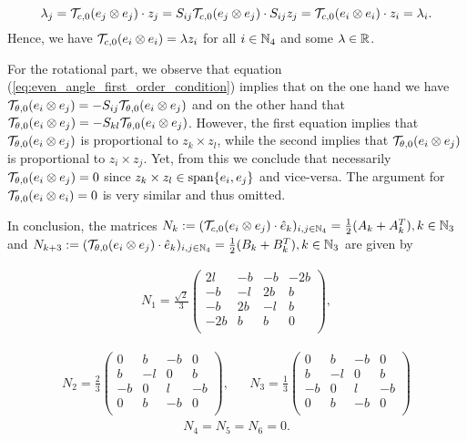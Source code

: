 \begin{equation}
\lambda_j = \mathcal{T}_{c,0}(e_j \otimes e_j) \cdot z_j = S_{ij} \mathcal{T}_{c,0}(e_j \otimes e_j) \cdot S_{ij} z_j = \mathcal{T}_{c,0}(e_i \otimes e_i) \cdot z_i = \lambda_i.
\end{equation}
Hence, we have $\mathcal{T}_{c,0}(e_i\otimes e_i) = \lambda z_i$ for all $i\in \mathbb{N}_4$ and some $\lambda \in \mathbb{R}$.

For the rotational part, we observe that equation (\ref{eq:even_angle_first_order_condition}) implies that on the one hand we have $\mathcal{T}_{\theta,0}(e_i \otimes e_j) = - S_{ij} \mathcal{T}_{\theta,0}(e_i \otimes e_j)$ and on the other hand that $\mathcal{T}_{\theta,0}(e_i \otimes e_j) = -S_{kl} \mathcal{T}_{\theta,0}(e_i \otimes e_j)$. However, the first equation implies that $\mathcal{T}_{\theta,0}(e_i \otimes e_j)$ is proportional to $z_k \times z_l$, while the second implies that $\mathcal{T}_{\theta,0}(e_i \otimes e_j)$ is proportional to $z_i \times z_j$. Yet, from this we conclude that necessarily $\mathcal{T}_{\theta,0}(e_i \otimes e_j) = 0$ since $z_k \times z_l \in \operatorname{span}\{e_i, e_j\}$ and vice-versa. The argument for $\mathcal{T}_{\theta,0}(e_i \otimes e_i)  = 0$ is very similar and thus omitted.

In conclusion, the matrices $N_k :=( \mathcal{T}_{c,0}(e_i \otimes e_j)\cdot  \hat{e}_k)_{i,j \in \mathbb{N}_4}  = \tfrac{1}{2}(A_k + A_k^T), k \in \mathbb{N}_3$ and $N_{k + 3} := ( \mathcal{T}_{\theta,0}(e_i \otimes e_j)\cdot  \hat{e}_k)_{i,j \in \mathbb{N}_4}  = \tfrac{1}{2}(B_k + B_k^T), k \in \mathbb{N}_3$ are given by


\begin{align}
 N_1 = \frac{\sqrt{2}}{3}\left(
\begin{array}{cccc}
 2 l & -b & -b & -2 b \\
 -b & -l & 2 b & b \\
 -b & 2 b & -l & b \\
 -2 b & b & b & 0 \\
\end{array}
\right),
\end{align}

\begin{eqnarray}
N_2 =\frac{2}{3} \left(
\begin{array}{cccc}
 0 & b & -b & 0 \\
 b & -l & 0 & b \\
 -b & 0 & l & -b \\
 0 & b & -b & 0 \\
\end{array}
\right), & &
 N_3 = \frac{1}{3}\left(
\begin{array}{cccc}
 0 & b & -b & 0 \\
 b & -l & 0 & b \\
 -b & 0 & l & -b \\
 0 & b & -b & 0 \\
\end{array}
\right)
\end{eqnarray}
\renewcommand{\arraystretch}{1}
\begin{align}
N_4 = N_5 = N_6 = 0.
\end{align}
